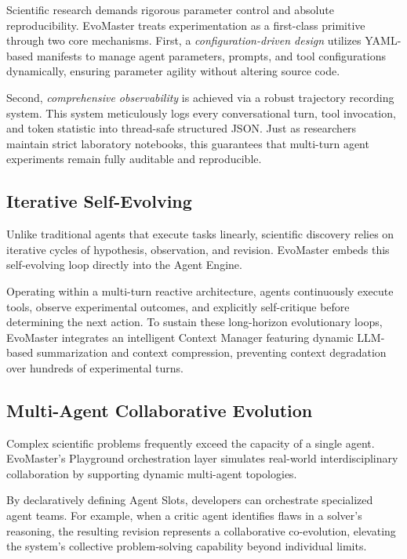 \documentclass[11pt, a4paper, logo, copyright, nonumbering]{cls/Sci}
\begin{document}
Scientific research demands rigorous parameter control and absolute reproducibility. EvoMaster treats experimentation as a first-class primitive through two core mechanisms. First, a \textit{configuration-driven design} utilizes YAML-based manifests to manage agent parameters, prompts, and tool configurations dynamically, ensuring parameter agility without altering source code. 

Second, \textit{comprehensive observability} is achieved via a robust trajectory recording system. This system meticulously logs every conversational turn, tool invocation, and token statistic into thread-safe structured JSON. Just as researchers maintain strict laboratory notebooks, this guarantees that multi-turn agent experiments remain fully auditable and reproducible.

\subsection{Iterative Self-Evolving}

Unlike traditional agents that execute tasks linearly, scientific discovery relies on iterative cycles of hypothesis, observation, and revision. EvoMaster embeds this self-evolving loop directly into the Agent Engine. 

Operating within a multi-turn reactive architecture, agents continuously execute tools, observe experimental outcomes, and explicitly self-critique before determining the next action. To sustain these long-horizon evolutionary loops, EvoMaster integrates an intelligent Context Manager featuring dynamic LLM-based summarization and context compression, preventing context degradation over hundreds of experimental turns.

\subsection{Multi-Agent Collaborative Evolution}

Complex scientific problems frequently exceed the capacity of a single agent. EvoMaster’s Playground orchestration layer simulates real-world interdisciplinary collaboration by supporting dynamic multi-agent topologies. 

By declaratively defining Agent Slots, developers can orchestrate specialized agent teams. For example, when a critic agent identifies flaws in a solver's reasoning, the resulting revision represents a collaborative co-evolution, elevating the system's collective problem-solving capability beyond individual limits.
\end{document}
